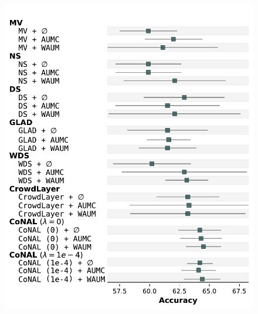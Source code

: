 \begin{figure}[thb]
    \centering
    \begin{minipage}{0.45\textwidth}
        \centering
        \includegraphics[width=\linewidth]{images/Accuracy_foresplot_music.pdf}
        \label{fig:forest_music_accuracy}
    \end{minipage}
    \hfill
    \begin{minipage}{0.45\textwidth}
        \centering

\end{minipage}
\end{figure}

